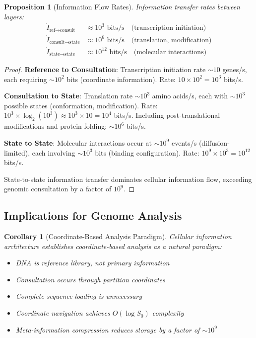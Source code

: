 \documentclass[11pt,a4paper]{article}
\newtheorem{corollary}[theorem]{Corollary}
\newtheorem{proposition}[theorem]{Proposition}
\theoremstyle{remark}
\begin{document}
\begin{proposition}[Information Flow Rates]
\label{prop:info_flow_rates}
Information transfer rates between layers:
\begin{align}
\dot{I}_{\text{ref} \to \text{consult}} &\approx 10^3 \text{ bits/s} \quad \text{(transcription initiation)} \\
\dot{I}_{\text{consult} \to \text{state}} &\approx 10^6 \text{ bits/s} \quad \text{(translation, modification)} \\
\dot{I}_{\text{state} \to \text{state}} &\approx 10^{12} \text{ bits/s} \quad \text{(molecular interactions)}
\end{align}
\end{proposition}

\begin{proof}
\textbf{Reference to Consultation}: Transcription initiation rate $\sim 10$ genes/s, each requiring $\sim 10^2$ bits (coordinate information). Rate: $10 \times 10^2 = 10^3$ bits/s.

\textbf{Consultation to State}: Translation rate $\sim 10^3$ amino acids/s, each with $\sim 10^3$ possible states (conformation, modification). Rate: $10^3 \times \log_2(10^3) \approx 10^3 \times 10 = 10^4$ bits/s. Including post-translational modifications and protein folding: $\sim 10^6$ bits/s.

\textbf{State to State}: Molecular interactions occur at $\sim 10^9$ events/s (diffusion-limited), each involving $\sim 10^3$ bits (binding configuration). Rate: $10^9 \times 10^3 = 10^{12}$ bits/s.

State-to-state information transfer dominates cellular information flow, exceeding genomic consultation by a factor of $10^9$.
\end{proof}


\subsection{Implications for Genome Analysis}

\begin{corollary}[Coordinate-Based Analysis Paradigm]
\label{cor:coordinate_paradigm}
Cellular information architecture establishes coordinate-based analysis as a natural paradigm:
\begin{itemize}
\item DNA is reference library, not primary information
\item Consultation occurs through partition coordinates
\item Complete sequence loading is unnecessary
\item Coordinate navigation achieves $O(\log S_0)$ complexity
\item Meta-information compression reduces storage by a factor of $\sim 10^9$
\end{itemize}
\end{corollary}
\end{document}
